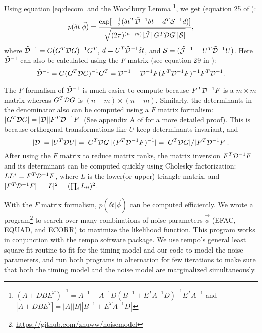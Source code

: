 {Using equation \ref{eq:decom} and the Woodbury Lemma
\footnote{$(A+DBE^T)^{-1}=A^{-1}-A^{-1}D(B^{-1}+E^TA^{-1}D)^{-1}E^TA^{-1}$ and
$|A+DBE^T| = |A||B||B^{-1}+E^TA^{-1}D|$}, we get (equation 25 of
\citealt{abb+14}):
\begin{equation}
\label{eq:Gform}
p(\delta t|\vec \phi) = \frac{\exp[-\frac{1}{2}(\delta t^T \tilde{\mathcal{D}}^{-1} \delta t -
d^T\mathcal{S}^{-1} d)]}{\sqrt{(2\pi)^{(n-m)}|\tilde{\mathcal{J}}||G^T \mathcal{D}
G||\mathcal{S}|}},
\end{equation}
where $\tilde{\mathcal{D}}^{-1} = G(G^T \mathcal{D} G)^{-1}G^T$, $d=U^T \tilde{\mathcal{D}}^{-1}\delta
t$, and $\mathcal{S} = (\tilde{\mathcal{J}}^{-1} + U^T \tilde{\mathcal{D}}^{-1}U)$.
Here $\tilde{\mathcal{D}}^{-1}$ can also be calculated using the $F$ matrix 
(see equation 29 in \citealt{vv14a}):
\begin{equation}
\label{eq:tildeD}
\tilde{\mathcal{D}}^{-1} = G(G^T\mathcal{D} G)^{-1}G^T = \mathcal{D}^{-1} -
\mathcal{D}^{-1}F(F^T\mathcal{D}^{-1}F)^{-1}F^T\mathcal{D}^{-1}.
\end{equation}

The $F$ formalism of $\tilde{\mathcal{D}}^{-1}$ is much easier to compute because $F^T\mathcal{D}^{-1}F$ is a $m\times m$ matrix whereas $G^T\mathcal{D} G$ is $(n-m)\times(n-m)$.
Similarly, the determinants in the denominator also can be computed using a $F$ matrix formalism: $|G^{T}\mathcal{D} G| = |\mathcal{D}||F^T\mathcal{D}^{-1}F|$ (See appendix A of \citet{vv14a} for a more detailed proof).
This is because orthogonal transformations like $U$ keep determinants invariant, and 
\begin{equation}
|\mathcal{D}| = |U^T \mathcal{D} U| = |G^T\mathcal{D} G||(F^T\mathcal{D}^{-1}F)^{-1}| = |G^T\mathcal{D} G|/|F^T
\mathcal{D}^{-1} F|.
\end{equation}
After using the $F$ matrix to reduce matrix ranks, the matrix inversion
$F^T\mathcal{D}^{-1}F$ and its determinant can be computed quickly using Cholesky
factorization:
$LL^* = F^T\mathcal{D}^{-1}F$, where $L$ is the lower(or upper) triangle matrix, and $|F^T\mathcal{D}^{-1}F| = |L|^2 = (\prod_i L_{ii})^2$.

With the $F$ matrix formalism, $p(\delta t|\vec \phi)$ can be computed
efficiently. 
We wrote a program\footnote{\url{https://github.com/zhuww/noisemodel}} to search over many combinations of noise parameters $\vec
\phi$ (EFAC, EQUAD, and ECORR) to maximize the likelihood
function. This program works in conjunction with the {\sc tempo} software package.
We use {\sc tempo}'s general least square fit routine to fit for the
timing model and our code to model the noise parameters, and run both programs
in alternation for few iterations to make sure that both the timing model and the
noise model are marginalized simultaneously.

}
